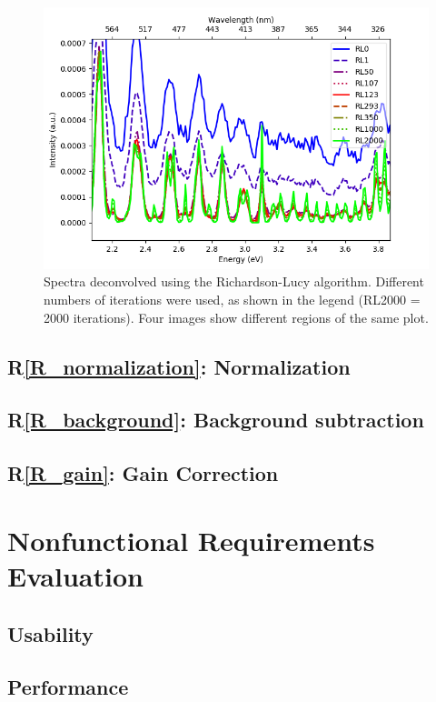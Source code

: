 \documentclass[12pt, titlepage]{article}
\newcommand{\rref}[1]{R\ref{#1}}
\begin{document}
\begin{figure}[h]
    \includegraphics[scale=0.4]{Deconvolved_spectra_SimNoise3-4.png}
    \caption{Spectra deconvolved using the Richardson-Lucy algorithm. Different numbers of iterations were used, as shown in the legend (RL2000 = 2000 iterations). Four images show different regions of the same plot.}
\end{figure}


\subsection{\rref{R_normalization}: Normalization}

\subsection{\rref{R_background}: Background subtraction}

\subsection{\rref{R_gain}: Gain Correction}

\section{Nonfunctional Requirements Evaluation}

\subsection{Usability}
		
\subsection{Performance}
\end{document}
